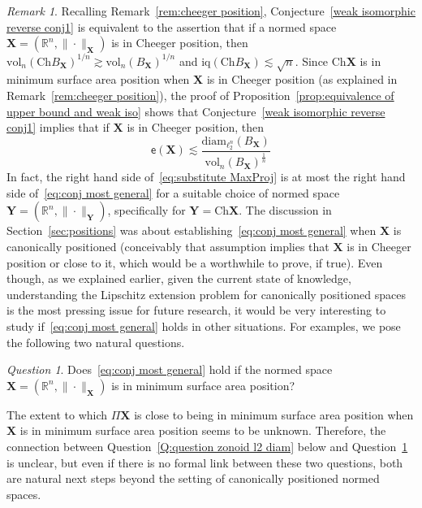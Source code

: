 \documentclass[11pt,reqno]{amsart}
\newcommand{\diam}{\mathrm{diam}}
\newcommand{\X}{\mathbf X}
\newcommand{\Y}{\mathbf Y}
\newcommand{\R}{\mathbb R}
\theoremstyle{remark}
\newtheorem{remark}[theorem]{Remark}
\newtheorem{question}[theorem]{Question}
\newcommand{\iq}{\mathrm{iq}}
\newcommand{\Ch}{\mathrm{Ch}}
\newcommand{\ee}{\mathsf{e}}
\newcommand{\vol}{\mathrm{vol}}
\renewcommand{\1}{\mathbf 1}
\begin{document}
\begin{remark}\label{rem:msevr} Recalling Remark~\ref{rem:cheeger position}, Conjecture~\ref{weak isomorphic reverse conj1} is equivalent to the assertion  that if a normed space $\X=(\R^n,\|\cdot\|_\X)$ is in Cheeger position, then $\vol_n(\Ch B_\X)^{1/n} \gtrsim \vol_n(B_\X)^{1/n}$ and $\iq(\Ch B_\X)\lesssim \sqrt{n}$. Since $\Ch \X$ is in minimum surface area position when $\X$ is in Cheeger position (as explained in Remark~\ref{rem:cheeger position}), the proof of Proposition~\ref{prop:equivalence of upper bound and weak iso} shows that Conjecture~\ref{weak isomorphic reverse conj1} implies that if $\X$ is in Cheeger position, then
\begin{equation}\label{eq:conj most general}
\ee(\X)\lesssim \frac{\diam_{\ell_2^n}(B_\X)}{\vol_n(B_\X)^{\frac{1}{n}}}
\end{equation}
In fact, the right hand side of~\eqref{eq:substitute MaxProj} is at most the right hand side of~\eqref{eq:conj most general} for a suitable choice of normed space $\Y=(\R^n,\|\cdot\|_\Y)$, specifically for $\Y=\Ch \X$. The discussion in Section~\ref{sec:positions}  was  about establishing~\eqref{eq:conj most general} when $\X$ is canonically positioned (conceivably that assumption implies that $\X$ is in Cheeger position or close to it, which would be a worthwhile to prove, if true). Even though, as we explained earlier,  given the current state of knowledge, understanding the Lipschitz extension problem for canonically positioned spaces is the most pressing issue for future research, it would be very interesting to study if~\eqref{eq:conj most general} holds in other situations. For examples, we pose the following two natural questions.

\begin{question}\label{Q:min surface position ratio} Does~\eqref{eq:conj most general} hold if the normed space $\X=(\R^n,\|\cdot\|_\X)$ is in  minimum surface area position?
\end{question}

The extent to which $\Pi\X$ is close to being in minimum surface area position when $\X$ is in minimum surface area position seems to be unknown. Therefore, the connection between Question~\ref{Q:question zonoid l2 diam} below and Question~\ref{Q:min surface position ratio}  is unclear, but even if there is no formal link between these two questions, both are natural next steps beyond the setting of canonically positioned normed spaces.


\end{remark}
\end{document}
